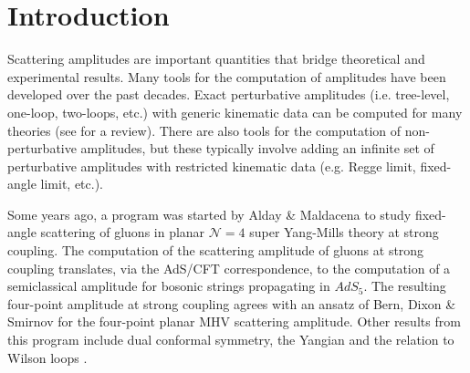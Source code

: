 \section{Introduction}
Scattering amplitudes are important quantities that bridge theoretical and experimental results. Many tools for the computation of amplitudes have been developed over the past decades. Exact perturbative amplitudes (i.e. tree-level, one-loop, two-loops, etc.) with generic kinematic data can be computed for many theories (see \cite{Elvang:2013cua} for a review). There are also tools for the computation of non-perturbative amplitudes, but these typically involve adding an infinite set of perturbative amplitudes with restricted kinematic data (e.g. Regge limit, fixed-angle limit, etc.).

Some years ago, a program was started by Alday \& Maldacena \cite{Alday:2007hr} to study fixed-angle scattering of gluons in planar $\mathcal{N} = 4$ super Yang-Mills theory at strong coupling. The computation of the scattering amplitude of gluons at strong coupling translates, via the AdS/CFT correspondence, to the computation of a semiclassical amplitude for bosonic strings propagating in $AdS_{5}$. The resulting four-point amplitude at strong coupling agrees with an ansatz of Bern, Dixon \& Smirnov \cite{Bern:2005iz} for the four-point planar MHV scattering amplitude. Other results from this program include dual conformal symmetry, the Yangian and the relation to Wilson loops \cite{Alday:2008yw,Drummond:2010km,Alday:2010kn}.

